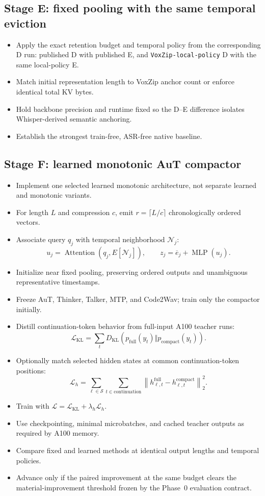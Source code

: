 \documentclass[10pt,letterpaper]{article}
\newcommand{\code}[1]{\texttt{#1}}
\begin{document}
\subsection{Stage E: fixed pooling with the same temporal eviction}
\begin{itemize}
    \item Apply the exact retention budget and temporal policy from the corresponding D run: published D with published E, and \code{VoxZip-local-policy} D with the same local-policy E.
    \item Match initial representation length to VoxZip anchor count or enforce identical total KV bytes.
    \item Hold backbone precision and runtime fixed so the D--E difference isolates Whisper-derived semantic anchoring.
    \item Establish the strongest train-free, ASR-free native baseline.
\end{itemize}

\subsection{Stage F: learned monotonic AuT compactor}
\begin{itemize}
    \item Implement one selected learned monotonic architecture, not separate learned and monotonic variants.
    \item For length $L$ and compression $c$, emit $r=\lceil L/c\rceil$ chronologically ordered vectors.
    \item Associate query $q_j$ with temporal neighborhood $\mathcal N_j$:
    \[
    u_j=\operatorname{Attention}(q_j,E[\mathcal N_j]),\qquad
    z_j=\overline e_j+\operatorname{MLP}(u_j).
    \]
    \item Initialize near fixed pooling, preserving ordered outputs and unambiguous representative timestamps.
    \item Freeze AuT, Thinker, Talker, MTP, and Code2Wav; train only the compactor initially.
    \item Distill continuation-token behavior from full-input A100 teacher runs:
    \[
    \mathcal L_{\mathrm{KL}}=\sum_t D_{\mathrm{KL}}\left(p_{\mathrm{full}}(y_t)\Vert p_{\mathrm{compact}}(y_t)\right).
    \]
    \item Optionally match selected hidden states at common continuation-token positions:
    \[
    \mathcal L_h=\sum_{\ell\in\mathcal S}\sum_{t\in\mathrm{continuation}}
    \left\|h_{\ell,t}^{\mathrm{full}}-h_{\ell,t}^{\mathrm{compact}}\right\|_2^2.
    \]
    \item Train with $\mathcal L=\mathcal L_{\mathrm{KL}}+\lambda_h\mathcal L_h$.
    \item Use checkpointing, minimal microbatches, and cached teacher outputs as required by A100 memory.
    \item Compare fixed and learned methods at identical output lengths and temporal policies.
    \item Advance only if the paired improvement at the same budget clears the material-improvement threshold frozen by the Phase~0 evaluation contract.
\end{itemize}
\end{document}
